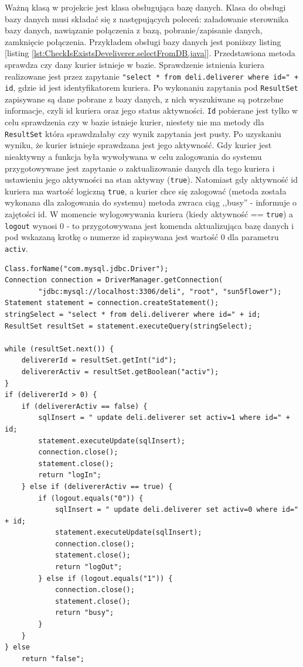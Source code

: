 \documentclass[eng,printmode,oneside]{mgr}
\begin{document}
Ważną klasą w projekcie jest klasa obsługująca bazę danych. Klasa do obsługi
bazy danych musi składać się z następujących poleceń: załadowanie sterownika
bazy danych, nawiązanie połączenia z bazą, pobranie/zapisanie danych, zamknięcie
połączenia. Przykładem obsługi bazy danych jest poniższy listing [listing
\ref{lst:CheckIsExistsDeveliverer.selectFromDB.java}]. Przedstawiona metoda
sprawdza czy dany kurier istnieje w bazie. Sprawdzenie istnienia
kuriera realizowane jest przez zapytanie \texttt{"select * from deli.deliverer where id=" + id}, gdzie id jest
identyfikatorem kuriera. Po wykonaniu zapytania pod \texttt{ResultSet}
zapisywane są dane pobrane z bazy danych, z nich wyszukiwane są potrzebne informacje, czyli
id kuriera oraz jego status aktywności. \texttt{Id} pobierane jest tylko w celu
sprawdzenia czy w bazie istnieje kurier, niestety nie ma metody dla
\texttt{ResultSet} która sprawdzałaby czy wynik zapytania jest pusty. Po
uzyskaniu wyniku, że kurier istnieje sprawdzana jest jego aktywność. Gdy kurier
jest nieaktywny a funkcja była wywoływana w celu zalogowania do systemu
przygotowywane jest zapytanie o zaktualizowanie danych dla tego kuriera i
ustawieniu jego aktywności na stan aktywny (\texttt{true}). Natomiast gdy
aktywność id kuriera ma wartość logiczną \texttt{true}, a kurier chce się
zalogować (metoda została wykonana dla zalogowania do systemu) metoda zwraca
ciąg ,,busy'' - informuje o zajętości id.
W momencie wylogowywania kuriera (kiedy aktywność == \texttt{true}) a
\texttt{logout} wynosi 0 - to przygotowywana jest komenda aktualizująca bazę
danych i pod wskazaną krotkę o numerze id zapisywana jest wartość 0 dla
parametru \texttt{activ}.

\begin{lstlisting}[caption=Połączenia z bazą danych na przykładzie metody
sprawdzającej istnienie kuriera oraz jego stan
używanej przez aplikację
mobilną,label=lst:CheckIsExistsDeveliverer.selectFromDB.java]
Class.forName("com.mysql.jdbc.Driver");
Connection connection = DriverManager.getConnection(
		"jdbc:mysql://localhost:3306/deli", "root", "sun5flower");
Statement statement = connection.createStatement();
stringSelect = "select * from deli.deliverer where id=" + id;
ResultSet resultSet = statement.executeQuery(stringSelect);

while (resultSet.next()) {
	delivererId = resultSet.getInt("id");
	delivererActiv = resultSet.getBoolean("activ");
} 
if (delivererId > 0) {
	if (delivererActiv == false) {
		sqlInsert = " update deli.deliverer set activ=1 where id=" + id;
		statement.executeUpdate(sqlInsert);
		connection.close();
		statement.close();
		return "logIn";
	} else if (delivererActiv == true) {
		if (logout.equals("0")) {
			sqlInsert = " update deli.deliverer set activ=0 where id=" + id;
			statement.executeUpdate(sqlInsert);
			connection.close();
			statement.close();
			return "logOut";
		} else if (logout.equals("1")) {
			connection.close();
			statement.close();
			return "busy";
		}
	}
} else
	return "false";
\end{lstlisting}
\end{document}
